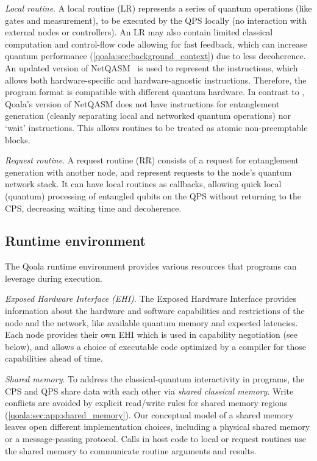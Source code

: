 \textit{Local routine}.
A local routine (LR) represents a series of quantum operations (like gates and measurement), to be executed by the QPS locally (no interaction with external nodes or controllers).
An LR may also contain limited classical computation and control-flow code allowing for fast feedback, which can increase quantum performance (\cref{qoala:sec:background_context}) due to less decoherence.
An updated version of NetQASM~\cite{dahlberg2022netqasm} is used to represent the instructions, which allows both hardware-specific and hardware-agnostic instructions.
Therefore, the program format is compatible with different quantum hardware.
In contrast to \cite{dahlberg2022netqasm}, Qoala's version of NetQASM does not have instructions for entanglement generation (cleanly separating local and networked quantum operations)
nor `wait' instructions. This allows routines to be treated as atomic non-preemptable blocks.

\textit{Request routine}. A request routine (RR) consists of a request for entanglement generation with another node, and represent requests to the node's quantum network stack.
It can have local routines as callbacks, allowing quick local (quantum) processing of entangled qubits on the QPS without returning to the CPS, decreasing waiting time and decoherence.


\subsection{Runtime environment}
\label{qoala:sec:runtime_environment}
The Qoala runtime environment provides various resources that programs can leverage during execution.

\textit{Exposed Hardware Interface (EHI)}.
The Exposed Hardware Interface provides information about the hardware and software capabilities and restrictions of the node and the network,
like available quantum memory and expected latencies.
Each node provides their own EHI which is used in capability negotiation (see below), and allows a choice of executable code optimized by a compiler for those capabilities ahead of time. 

\textit{Shared memory}.
To address the classical-quantum interactivity in programs, the CPS and QPS share data with each other via \textit{shared classical memory}.
Write conflicts are avoided by explicit read/write rules for shared memory regions (\cref{qoala:sec:app:shared_memory}).
Our conceptual model of a shared memory leaves open different implementation choices, including a physical shared memory or a message-passing protocol.
Calls in host code to local or request routines use the shared memory to communicate routine arguments and results.

